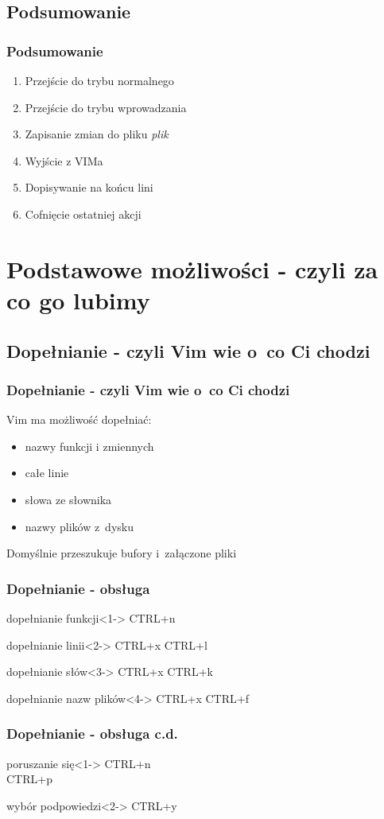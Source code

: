 \documentclass[10pt]{beamer}
\begin{document}
\subsection{Podsumowanie}
\begin{frame}
	\frametitle{Podsumowanie}
	\begin{enumerate}
		\item [ESC] Przejście do trybu normalnego
		\item [i] Przejście do trybu wprowadzania
		\item [:w plik] Zapisanie zmian do pliku \textit{plik}
		\item [:q] Wyjście z VIMa
		\item [A] Dopisywanie na końcu lini
		\item [u] Cofnięcie ostatniej akcji
	\end{enumerate}
\end{frame}
\section{Podstawowe możliwości - czyli za co go lubimy}
\subsection{Dopełnianie - czyli Vim wie o~co Ci chodzi}
\begin{frame}
	\frametitle{Dopełnianie - czyli Vim wie o~co Ci chodzi}
	Vim ma możliwość dopełniać:
	\begin{itemize}[<+->]
		\item nazwy funkcji i zmiennych
		\item całe linie
		\item słowa ze słownika
		\item nazwy plików z~dysku
	\end{itemize}
	{
		Domyślnie przeszukuje bufory i~załączone pliki
	}
\end{frame}
\begin{frame}
	\frametitle{Dopełnianie - obsługa}
	\begin{block}{dopełnianie funkcji}<1->
		CTRL+n
	\end{block}
	\begin{block}{dopełnianie linii}<2->
		CTRL+x CTRL+l
	\end{block}
	\begin{block}{dopełnianie słów}<3->
		CTRL+x CTRL+k
	\end{block}
	\begin{block}{dopełnianie nazw plików}<4->
		CTRL+x CTRL+f
	\end{block}
\end{frame}
\begin{frame}
	\frametitle{Dopełnianie - obsługa c.d.}
	\begin{block}{poruszanie się}<1->
		CTRL+n\\
		CTRL+p
	\end{block}
	\begin{block}{wybór podpowiedzi}<2->
		CTRL+y
	\end{block}
\end{frame}
\end{document}
